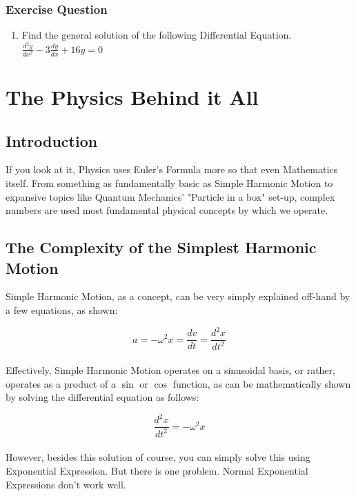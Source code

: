 \documentclass[a4paper,12pt,oneside]{book}
\begin{document}
\subsection{Exercise Question}
\begin{enumerate}
    \item Find the general solution of the following Differential Equation.\\
    $\displaystyle \frac{d^2y}{dx^2}-3\frac{dy}{dx}+16y =0$
\end{enumerate}


\newpage
\chapter{The Physics Behind it All}
\section{Introduction}
If you look at it, Physics uses Euler's Formula more so that even Mathematics itself. From something as fundamentally basic as Simple Harmonic Motion to expansive topics like Quantum Mechanics' "Particle in a box" set-up, complex numbers are used most fundamental physical concepts by which we operate.

\section{The Complexity of the Simplest Harmonic Motion}
Simple Harmonic Motion, as a concept, can be very simply explained off-hand by a few equations, as shown:

\[a = -\omega^2 x = \frac{dv}{dt} = \frac{d^2x}{dt^2} \] \\

Effectively, Simple Harmonic Motion operates on a sinusoidal basis, or rather, operates as a product of a $\sin$ or $\cos$ function, as can be mathematically shown by solving the differential equation as follows:

\[\frac{d^2x}{dt^2} = -\omega^2 x \] \\

However, besides this solution of course, you can simply solve this using Exponential Expression. But there is one problem. Normal Exponential Expressions don't work well.
\end{document}
